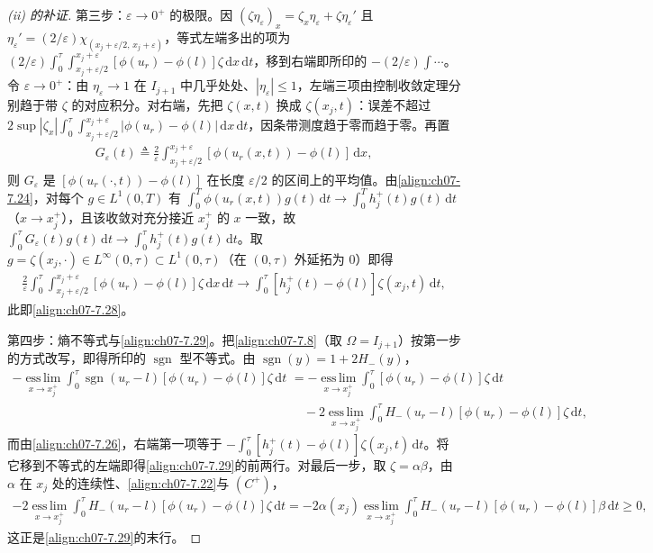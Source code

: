 \documentclass[../../main.tex]{subfiles}%
\begin{document}
\begin{proof}[(ii) 的补证]
第三步：$\varepsilon\to0^+$ 的极限。因 $(\zeta\eta_\varepsilon)_x=\zeta_x\eta_\varepsilon+\zeta\eta_\varepsilon'$ 且 $\eta_\varepsilon'=(2/\varepsilon)\chi_{(x_j+\varepsilon/2,\,x_j+\varepsilon)}$，等式左端多出的项为 $(2/\varepsilon)\int_0^\tau\int_{x_j+\varepsilon/2}^{x_j+\varepsilon}[\phi(u_r)-\phi(l)]\zeta\,\mathrm{d}x\,\mathrm{d}t$，移到右端即所印的 $-(2/\varepsilon)\int\cdots$。令 $\varepsilon\to0^+$：由 $\eta_\varepsilon\to1$ 在 $I_{j+1}$ 中几乎处处、$|\eta_\varepsilon|\leqslant1$，左端三项由控制收敛定理分别趋于带 $\zeta$ 的对应积分。对右端，先把 $\zeta(x,t)$ 换成 $\zeta(x_j,t)$：误差不超过 $2\sup|\zeta_x|\int_0^\tau\int_{x_j+\varepsilon/2}^{x_j+\varepsilon}|\phi(u_r)-\phi(l)|\,\mathrm{d}x\,\mathrm{d}t$，因条带测度趋于零而趋于零。再置
\begin{align*}
G_\varepsilon(t)\triangleq\frac{2}{\varepsilon}\int_{x_j+\varepsilon/2}^{x_j+\varepsilon}[\phi(u_r(x,t))-\phi(l)]\,\mathrm{d}x,
\end{align*}
则 $G_\varepsilon$ 是 $[\phi(u_r(\cdot,t))-\phi(l)]$ 在长度 $\varepsilon/2$ 的区间上的平均值。由\eqref{align:ch07-7.24}，对每个 $g\in L^1(0,T)$ 有 $\int_0^T\phi(u_r(x,t))g(t)\,\mathrm{d}t\to\int_0^Th_j^+(t)g(t)\,\mathrm{d}t$（$x\to x_j^+$），且该收敛对充分接近 $x_j^+$ 的 $x$ 一致，故 $\int_0^\tau G_\varepsilon(t)g(t)\,\mathrm{d}t\to\int_0^\tau h_j^+(t)g(t)\,\mathrm{d}t$。取 $g=\zeta(x_j,\cdot)\in L^\infty(0,\tau)\subset L^1(0,\tau)$（在 $(0,\tau)$ 外延拓为 $0$）即得
\begin{align*}
\frac{2}{\varepsilon}\int_0^\tau\int_{x_j+\varepsilon/2}^{x_j+\varepsilon}[\phi(u_r)-\phi(l)]\zeta\,\mathrm{d}x\,\mathrm{d}t
\to\int_0^\tau[h_j^+(t)-\phi(l)]\zeta(x_j,t)\,\mathrm{d}t,
\end{align*}
此即\eqref{align:ch07-7.28}。

第四步：熵不等式与\eqref{align:ch07-7.29}。把\eqref{align:ch07-7.8}（取 $\Omega=I_{j+1}$）按第一步的方式改写，即得所印的 $\operatorname{sgn}$ 型不等式。由 $\operatorname{sgn}(y)=1+2H_-(y)$，
\begin{align*}
-\operatorname*{ess\,lim}_{x\to x_j^+}\int_0^\tau\operatorname{sgn}(u_r-l)[\phi(u_r)-\phi(l)]\zeta\,\mathrm{d}t
&=-\operatorname*{ess\,lim}_{x\to x_j^+}\int_0^\tau[\phi(u_r)-\phi(l)]\zeta\,\mathrm{d}t\\
&\quad-2\operatorname*{ess\,lim}_{x\to x_j^+}\int_0^\tau H_-(u_r-l)[\phi(u_r)-\phi(l)]\zeta\,\mathrm{d}t,
\end{align*}
而由\eqref{align:ch07-7.26}，右端第一项等于 $-\int_0^\tau[h_j^+(t)-\phi(l)]\zeta(x_j,t)\,\mathrm{d}t$。将它移到不等式的左端即得\eqref{align:ch07-7.29}的前两行。对最后一步，取 $\zeta=\alpha\beta$，由 $\alpha$ 在 $x_j$ 处的连续性、\eqref{align:ch07-7.22}与 $(C^+)$，
\begin{align*}
-2\operatorname*{ess\,lim}_{x\to x_j^+}\int_0^\tau H_-(u_r-l)[\phi(u_r)-\phi(l)]\zeta\,\mathrm{d}t
=-2\alpha(x_j)\operatorname*{ess\,lim}_{x\to x_j^+}\int_0^\tau H_-(u_r-l)[\phi(u_r)-\phi(l)]\beta\,\mathrm{d}t\geqslant0,
\end{align*}
这正是\eqref{align:ch07-7.29}的末行。


\end{proof}
\end{document}
